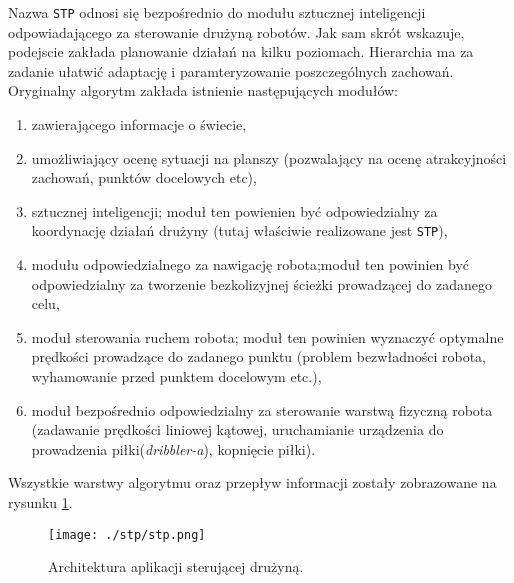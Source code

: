 Nazwa \texttt{STP} odnosi się bezpośrednio do modułu sztucznej inteligencji odpowiadającego za sterowanie drużyną robotów. Jak sam skrót wskazuje, podejscie 
zakłada planowanie działań na kilku poziomach. Hierarchia ma za zadanie ułatwić adaptację i paramteryzowanie poszczególnych zachowań.
Oryginalny algorytm zakłada istnienie następujących modułów:
\begin{enumerate}
  \item zawierającego informacje o świecie,
  \item umożliwiający ocenę sytuacji na planszy (pozwalający na ocenę atrakcyjności zachowań, punktów docelowych etc),
  \item sztucznej inteligencji; moduł ten powienien być odpowiedzialny za koordynację działań drużyny (tutaj właściwie realizowane jest \texttt{STP}),
  \item modułu odpowiedzialnego za nawigację robota;moduł ten powinien być odpowiedzialny za tworzenie bezkolizyjnej ścieżki prowadzącej do zadanego celu,
  \item moduł sterowania ruchem robota;
  moduł ten powinien wyznaczyć optymalne prędkości prowadzące do zadanego punktu (problem bezwładności robota,
  wyhamowanie przed punktem docelowym etc.),
  \item moduł bezpośrednio odpowiedzialny za sterowanie warstwą fizyczną robota (zadawanie prędkości liniowej kątowej, uruchamianie urządzenia do prowadzenia 
  piłki(\textit{dribbler-a}), kopnięcie piłki).
\end{enumerate}
Wszystkie warstwy algorytmu oraz przepływ informacji zostały zobrazowane na rysunku \ref{fig:stp}.
\begin{figure}[h]
\centering
\texttt{[image: ./stp/stp.png]}
\caption{ Architektura aplikacji sterującej drużyną.} \label{fig:stp}
\end{figure}
